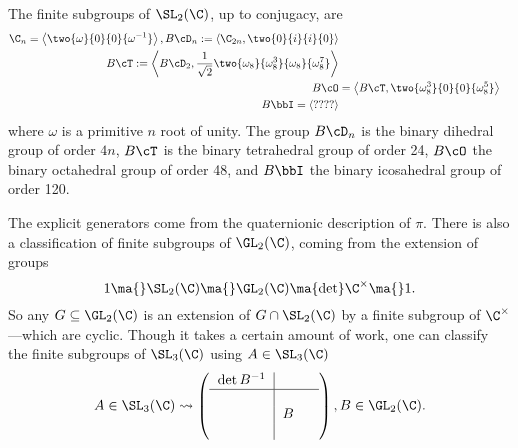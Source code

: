 \begin{thm}
The finite subgroups of $\SL_2(\C)$, up to conjugacy, are
	\[
	\begin{split}
	\C_n=\left\langle \two{\omega}{0}{0}{\omega^{-1}} \right\rangle,
	B\cD_n:= \left\langle \C_{2n}, \two{0}{i}{i}{0} \right\rangle \\
	B\cT:= \left\langle B\cD_2, \dfrac{1}{\sqrt{2}} \two{\omega_8}{\omega_8^3}{\omega_8}{\omega_8^7} \right\rangle \\
	B\cO&= \left\langle B\cT, \two{\omega_8^3}{0}{0}{\omega_8^5} \right\rangle \\
	B\bbI= \left\langle ????\right\rangle
	\end{split}
	\]
where $\omega$ is a primitive $n$ root of unity. The group $B\cD_n$ is the binary dihedral group of order $4n$, $B\cT$ is the binary tetrahedral group of order 24, $B\cO$ the binary octahedral group of order 48, and $B\bbI$ the binary icosahedral group of order 120. 
\end{thm}


The explicit generators come from the quaternionic description of $\pi$. There is also a classification of finite subgroups of $\GL_2(\C)$, coming from the extension of groups
	\[
	1 \ma{} \SL_2(\C) \ma{} \GL_2(\C) \ma{\det} \C^\times \ma{} 1.
	\]
So any $G \subseteq \GL_2(\C)$ is an extension of $G \cap \SL_2(\C)$ by a finite subgroup of $\C^\times$---which are cyclic. Though it takes a certain amount of work, one can classify the finite subgroups of $\SL_3(\C)$ using $A \in \SL_3(\C)$
	\[
	A \in \SL_3(\C) \rightsquigarrow \left( \begin{tabular}{c|ccc} $\det B^{-1}$ & & \\ \hline & & \\ & $B$ & \\ & & \end{tabular} \right), B \in \GL_2(\C).
	\]


























